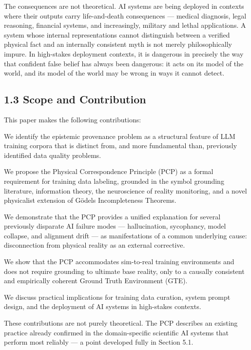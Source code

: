 \documentclass[
]{article}
\begin{document}
The consequences are not theoretical. AI systems are being deployed in
contexts where their outputs carry life-and-death consequences ---
medical diagnosis, legal reasoning, financial systems, and increasingly,
military and lethal applications. A system whose internal
representations cannot distinguish between a verified physical fact and
an internally consistent myth is not merely philosophically impure. In
high-stakes deployment contexts, it is dangerous in precisely the way
that confident false belief has always been dangerous: it acts on its
model of the world, and its model of the world may be wrong in ways it
cannot detect.

\subsection{1.3 Scope and Contribution}\label{scope-and-contribution}

This paper makes the following contributions:

We identify the epistemic provenance problem as a structural feature of
LLM training corpora that is distinct from, and more fundamental than,
previously identified data quality problems.

We propose the Physical Correspondence Principle (PCP) as a formal
requirement for training data labeling, grounded in the symbol grounding
literature, information theory, the neuroscience of reality monitoring,
and a novel physicalist extension of Gödel\textquotesingle s
Incompleteness Theorems.

We demonstrate that the PCP provides a unified explanation for several
previously disparate AI failure modes --- hallucination, sycophancy,
model collapse, and alignment drift --- as manifestations of a common
underlying cause: disconnection from physical reality as an external
corrective.

We show that the PCP accommodates sim-to-real training environments and
does not require grounding to ultimate base reality, only to a causally
consistent and empirically coherent Ground Truth Environment (GTE).

We discuss practical implications for training data curation, system
prompt design, and the deployment of AI systems in high-stakes contexts.

These contributions are not purely theoretical. The PCP describes an
existing practice already confirmed in the domain-specific scientific AI
systems that perform most reliably --- a point developed fully in
Section 5.1.
\end{document}
